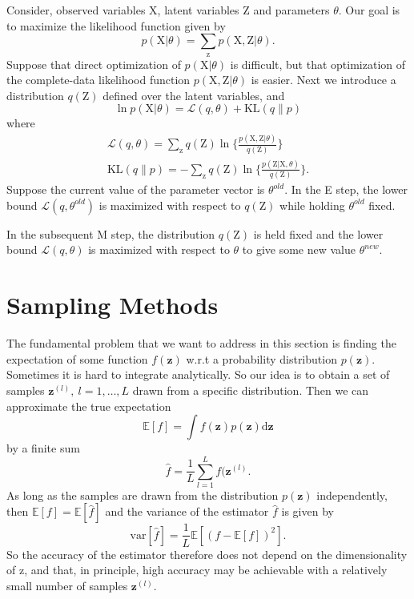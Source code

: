 \documentclass[a4paper]{book}
\newcommand{\mrm}{\mathrm}
\newcommand{\mbf}{\mathbf}
\newcommand{\ud}{\mathrm{d}}
\newcommand{\zz}{\mbf z}
\newcommand{\Exp}{\mathbb{E}}
\begin{document}
Consider, observed variables $\mrm X$, latent variables $\mrm Z$ and parameters $\theta$. Our goal is to maximize the likelihood function given by
\begin{equation}\label{}
  p(\mrm X|\theta)=\sum_{\mrm z}p(\mrm X,\mrm Z|\theta).
\end{equation}
Suppose that direct optimization of $p(\mrm X|\theta)$ is difficult, but that optimization of the complete-data likelihood function $p(\mrm X,\mrm Z|\theta)$ is easier. Next we introduce a distribution $q(\mrm Z)$ defined over the latent variables, and
\begin{equation}\label{}
  \ln p(\mrm X|\theta) = \mathcal L(q,\theta)+\mrm{KL}(q\|p)
\end{equation}
where
\begin{gather}\label{}
  \mathcal L(q,\theta) = \sum_{\mrm z}q(\mrm Z)\ln\{\frac{p(\mrm X,\mrm Z|\theta)}{q(\mrm Z)}\} \\
  \mrm {KL}(q\|p)=-\sum_{\mrm z}q(\mrm Z)\ln\{\frac{p(\mrm Z|\mrm X,\theta)}{q(\mrm Z)}\}.
\end{gather}
 Suppose the current value of the parameter vector is $\theta^{old}$. In the E step, the lower bound $\mathcal L(q,\theta^{old})$ is maximized with respect to $q(\mrm Z)$ while holding $\theta^{old}$ fixed.

 In the subsequent M step, the distribution $q(\mrm Z)$ is held fixed and the lower bound $\mathcal L(q, \theta)$ is maximized with respect to $\theta$ to give some new value $\theta^{new}$.

\section{Sampling Methods}
The fundamental problem that we want to address in this section is finding the expectation of some function $f(\zz)$ w.r.t a probability distribution $p(\zz)$. Sometimes it is hard to integrate analytically. So our idea is to obtain a set of samples $\zz^{(l)},\ l=1,\dots,L$ drawn from a specific distribution. Then we can approximate the true expectation
\begin{equation}\label{}
  \Exp[f]=\int f(\zz)p(\zz)\ud\zz
\end{equation}
by a finite sum
\begin{equation}\label{}
\hat f=\frac1L\sum_{l=1}^{L}f(\zz^{(l)}.
\end{equation}
As long as the samples are drawn from the distribution $p(\zz)$ independently, then $\Exp[f] = \Exp[\hat f]$ and the variance of the estimator $\hat f$ is given by
\begin{equation}\label{}
  \mrm{var}[\hat f] =\frac1L\Exp[(f-\Exp[f])^2].
\end{equation}
So the accuracy of the estimator therefore does not depend on the dimensionality of z, and that, in principle, high accuracy may be achievable with a relatively small number of samples $\zz^{(l)}$.
\end{document}
